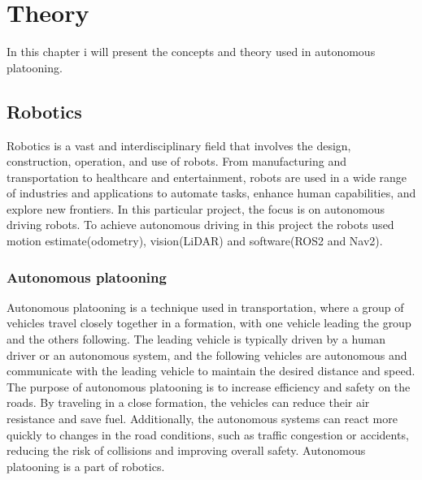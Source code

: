 \chapter{Theory}
In this chapter i will present the concepts and theory used in autonomous platooning.  
\section{Robotics}
Robotics is a vast and interdisciplinary field that involves the design, construction, operation, and use of robots. From manufacturing and transportation to healthcare and entertainment, robots are used in a wide range of industries and applications to automate tasks, enhance human capabilities, and explore new frontiers.
In this particular project, the focus is on autonomous driving robots. To achieve autonomous driving in this project the robots used motion estimate(odometry), vision(LiDAR) and software(ROS2 and Nav2). 

\subsection{Autonomous platooning}
Autonomous platooning is a technique used in transportation, where a group of vehicles travel closely together in a formation, with one vehicle leading the group and the others following. The leading vehicle is typically driven by a human driver or an autonomous system, and the following vehicles are autonomous and communicate with the leading vehicle to maintain the desired distance and speed. The purpose of autonomous platooning is to increase efficiency and safety on the roads. By traveling in a close formation, the vehicles can reduce their air resistance and save fuel. Additionally, the autonomous systems can react more quickly to changes in the road conditions, such as traffic congestion or accidents, reducing the risk of collisions and improving overall safety. Autonomous platooning is a part of robotics.

